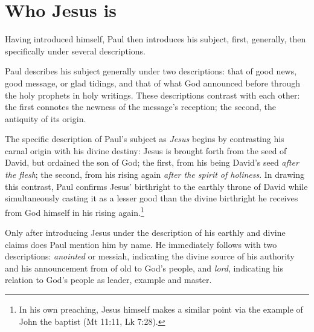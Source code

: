 \section{Who Jesus is}
Having introduced himself, Paul then introduces his subject, first, generally, then specifically under several descriptions. 

Paul describes his subject generally under two descriptions: that of good news, good message, or glad tidings, and that of what God announced before through the holy prophets in holy writings. These descriptions contrast with each other: the first connotes the newness of the message's reception; the second, the antiquity of its origin. 

The specific description of Paul's subject as \emph{Jesus} begins by contrasting his carnal origin with his divine destiny: Jesus is brought forth from the seed of David, but ordained the son of God; the first, from his being David's seed \emph{after the flesh}; the second, from his rising again \emph{after the spirit of holiness}. In drawing this contrast, Paul confirms Jesus' birthright to the earthly throne of David while simultaneously casting it as a lesser good than the divine birthright he receives from God himself in his rising again.\footnote{In his own preaching, Jesus himself makes a similar point via the example of John the baptist (Mt 11:11, Lk 7:28).}

Only after introducing Jesus under the description of his earthly and divine claims does Paul mention him by name. He immediately follows with two descriptions: \emph{anointed} or messiah, indicating the divine source of his authority and his announcement from of old to God's people, and \emph{lord}, indicating his relation to God's people as leader, example and master. 


